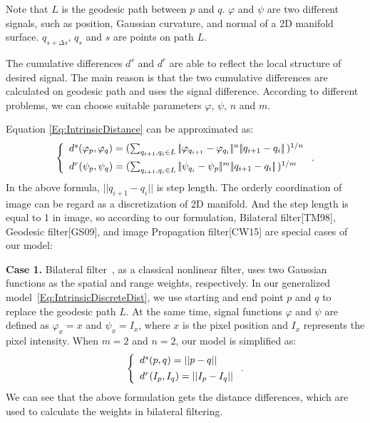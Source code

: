 Note that $L$ is the geodesic path between $p$ and $q$.
$\varphi$ and $\psi$ are two different signals, such as position, Gaussian curvature, and normal of a 2D manifold surface.
$q_{s + \Delta{s}}$, $q_s$ and $s$ are points on path $L$.

The cumulative differences $d^s$ and $d^r$ are able to reflect the local structure of desired signal.
The main reason is that the two cumulative differences are calculated on geodesic path and uses the signal difference.
According to different problems, we can choose suitable parameters $\varphi$, $\psi$, $n$ and $m$.

Equation \ref{Eq:IntrinsicDistance} can be approximated as:
 \begin{equation}
 \label{Eq:IntrinsicDiscreteDist}
 \left \{
 \begin{array}{ll}
        d^{s}(\varphi_p, \varphi_q) = (\sum_{q_{i+1}, q_i \in{L}}|\!|\varphi_{q_{i+1}} - \varphi_{q_i}|\!|^{n}|\!|q_{i+1} - q_{i}|\!|\,)^{1/n} \vspace{1.5mm}\\
        d^{r}(\psi_p, \psi_q) = (\sum_{q_{i+1}, q_i \in{L}}|\!|\psi_{q_i} - \psi_{p}|\!|^{m}|\!|q_{i+1} - q_{i}|\!|\,)^{1/m}
 \end{array}
 \right. .
 \end{equation}
In the above formula, $|\!|q_{i+1} - q_{i}|\!|$ is step length.
The orderly coordination of image can be regard as a discretization of 2D manifold.
And the step length is equal to 1 in image,
so according to our formulation, Bilateral filter[TM98], Geodesic filter[GS09], and image Propagation filter[CW15] are special cases of our model:

{\bfseries Case 1.}
Bilateral filter~\cite{tomasi1998bilateral}, as a classical nonlinear filter, uses two Gaussian functions as the spatial and range weights, respectively.
In our generalized model~\ref{Eq:IntrinsicDiscreteDist}, we use starting and end point $p$ and $q$ to replace the geodesic path $L$.
At the same time, signal functions $\varphi$ and $\psi$ are defined as $\varphi_{x} = x$ and $\psi_{x} = I_x$,
where $x$ is the pixel position and $I_x$ represents the pixel intensity.
When $m=2$ and $n=2$, our model is simplified as:
\begin{equation}
\label{Eq:BilateralDistance}
\left \{
\begin{array}{ll}
        d^{s}(p, q) = ||p - q|| \vspace{1.5mm}\\
        d^{r}(I_{p}, I_{q}) = || I_{p} - I_{q} || \\
\end{array}
\right. .
\end{equation}
We can see that the above formulation gets the distance differences, which are used to calculate the weights in bilateral filtering.

